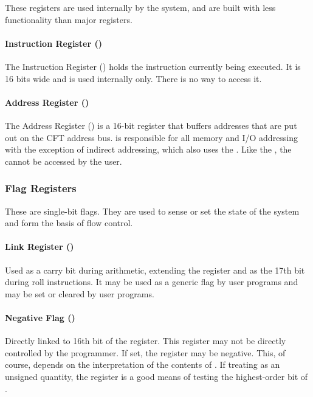 These registers are used internally by the system, and are built with
less functionality than major registers.

\paragraph{Instruction Register (\IR)}

The Instruction Register (\IR) holds the instruction currently being
executed. It is 16 bits wide and is used internally only. There is no
way to access it.

\paragraph{Address Register (\AR)}

The Address Register (\AR) is a 16-bit register that buffers addresses
that are put out on the CFT address bus. \AR{} is responsible for all
memory and I/O addressing with the exception of indirect addressing,
which also uses the \DR. Like the \IR, the {\AR} cannot be accessed by
the user.

\subsubsection{Flag Registers}

These are single-bit flags. They are used to sense or set the state of
the system and form the basis of flow control.

\paragraph{Link Register (\Lreg)}

Used as a carry bit during arithmetic, extending the \A{} register and
as the 17th bit during roll instructions. It may be used as a generic
flag by user programs and may be set or cleared by user programs.

\paragraph{Negative Flag (\Nreg)}

Directly linked to 16th bit of the \A{} register. This register may
not be directly controlled by the programmer. If set, the \A{}
register may be negative. This, of course, depends on the
interpretation of the contents of \A{}. If treating \A{} as an
unsigned quantity, the \Nreg{} register is a good means of testing the
highest-order bit of \A{}.

